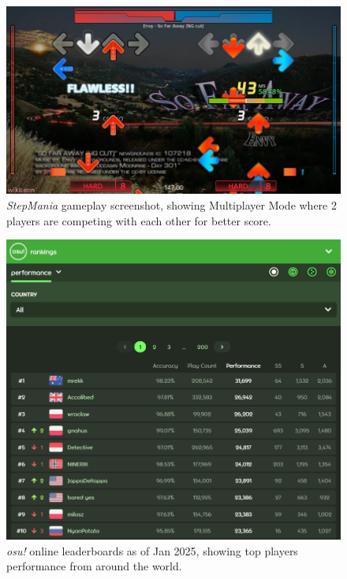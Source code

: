 \begin{figure}[h]
    \centering\includegraphics[scale=0.4]{obrazki/sm5multi.jpg}
    \caption{\textit{StepMania} gameplay screenshot, showing Multiplayer Mode where 2 players are competing with each other for better score. \cite{sm5multi}}
    \label{fig:sm5_multi}
\end{figure}

\begin{figure}[h]
    \centering\includegraphics[scale=0.405]{obrazki/osuleaderboards.png}
    \caption{\textit{osu!} online leaderboards as of Jan 2025, showing top players performance from around the world. \cite{osuleaderboards}}
    \label{fig:osu_leaderboards}
\end{figure}
 
